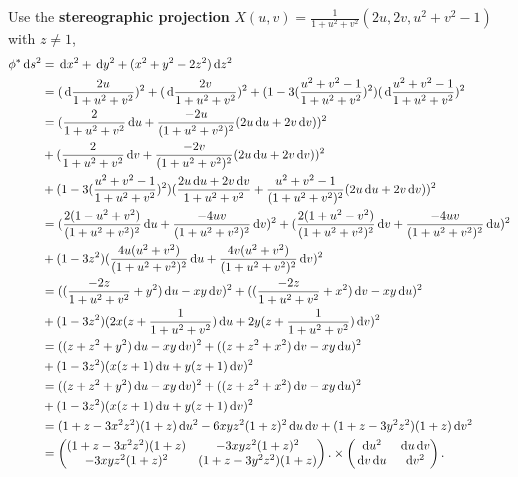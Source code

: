 \begin{enumerate}
\par Use the \textbf{stereographic projection} $X(u,v)=\frac{1}{1+u^2+v^2}(2u,2v,u^2+v^2-1)$ with $z\neq 1$, \begin{align*}
	\phi^* \,\mathrm{d} s^2 &= \,\mathrm{d} x^2 + \,\mathrm{d} y^2 + (x^2+y^2-2z^2)\,\mathrm{d} z^2 \\
	&= (\,\mathrm{d} \frac{2u}{1+u^2+v^2})^2+(\,\mathrm{d} \frac{2v}{1+u^2+v^2})^2 +(1-3(\frac{u^2+v^2-1}{1+u^2+v^2})^2)(\,\mathrm{d} \frac{u^2+v^2-1}{1+u^2+v^2})^2 \\
	&= (\frac{2}{1+u^2+v^2}\,\mathrm{d} u + \frac{-2u}{(1+u^2+v^2)^2}(2u\,\mathrm{d} u+2v\,\mathrm{d} v))^2 \\
	&+ (\frac{2}{1+u^2+v^2}\,\mathrm{d} v+ \frac{-2v}{(1+u^2+v^2)^2}(2u\,\mathrm{d} u+2v\,\mathrm{d} v))^2 \\
	&+ (1-3(\frac{u^2+v^2-1}{1+u^2+v^2})^2)(\frac{2u\,\mathrm{d} u+2v\,\mathrm{d} v}{1+u^2+v^2}+ \frac{u^2+v^2-1}{(1+u^2+v^2)^2}(2u\,\mathrm{d} u+2v\,\mathrm{d} v))^2 \\
	&= (\frac{2(1-u^2+v^2)}{(1+u^2+v^2)^2}\,\mathrm{d} u + \frac{-4uv}{(1+u^2+v^2)^2}\,\mathrm{d} v)^2+ (\frac{2(1+u^2-v^2)}{(1+u^2+v^2)^2}\,\mathrm{d} v + \frac{-4uv}{(1+u^2+v^2)^2}\,\mathrm{d} u)^2 \\
	&+ (1-3z^2)(\frac{4u(u^2+v^2)}{(1+u^2+v^2)^2}\,\mathrm{d} u+ \frac{4v(u^2+v^2)}{(1+u^2+v^2)^2}\,\mathrm{d} v)^2 \\
	&= ((\frac{-2z}{1+u^2+v^2}+y^2)\,\mathrm{d} u - xy\,\mathrm{d} v)^2+ ((\frac{-2z}{1+u^2+v^2}+x^2)\,\mathrm{d} v - xy\,\mathrm{d} u)^2 \\
	&+ (1-3z^2)(2x(z+\frac{1}{1+u^2+v^2})\,\mathrm{d} u+ 2y(z+\frac{1}{1+u^2+v^2})\,\mathrm{d} v)^2 \\
	&= ((z+z^2 +y^2)\,\mathrm{d} u - xy\,\mathrm{d} v)^2+ ((z+z^2+x^2)\,\mathrm{d} v - xy\,\mathrm{d} u)^2 \\
	&+ (1-3z^2)(x(z+1)\,\mathrm{d} u+ y(z+1)\,\mathrm{d} v)^2 \\
	&= ((z+z^2 +y^2)\,\mathrm{d} u - xy\,\mathrm{d} v)^2+ ((z+z^2+x^2)\,\mathrm{d} v - xy\,\mathrm{d} u)^2 \\
	&+ (1-3z^2)(x(z+1)\,\mathrm{d} u+ y(z+1)\,\mathrm{d} v)^2 \\
	&= (1+z-3x^2z^2)(1+z)\,\mathrm{d} u^2 -6xyz^2(1+z)^2\,\mathrm{d} u\,\mathrm{d} v +(1+z-3y^2z^2)(1+z)\,\mathrm{d} v^2 \\
	&= \begin{pmatrix}
	(1+z-3x^2z^2)(1+z) & -3xyz^2(1+z)^2 \\
	- 3xyz^2(1+z)^2 & (1+z-3y^2z^2)(1+z)
	\end{pmatrix}.\times \begin{pmatrix}
		\,\mathrm{d} u^2 & \,\mathrm{d} u \,\mathrm{d} v \\
		\,\mathrm{d} v\,\mathrm{d} u & \,\mathrm{d} v^2
	\end{pmatrix}.
\end{align*}

\end{enumerate}
